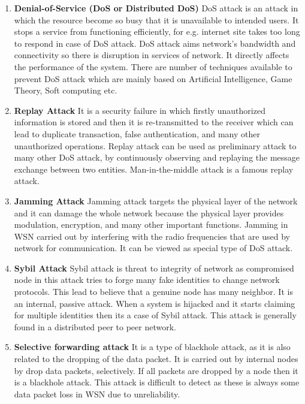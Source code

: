 \begin{enumerate}[label=\textbf{\roman*.}]
    \item \textbf{Denial-of-Service (DoS or Distributed DoS) }\cite{patil2016attack} DoS attack is an attack in which the resource become so busy that it is unavailable to intended users. It stops a service from functioning efficiently, for e.g. internet site takes too long to respond in case of DoS attack. DoS attack aims  network’s bandwidth and connectivity so there is disruption in services of network. It directly affects the performance of the system. There are number of techniques available to prevent DoS attack which are mainly based on Artificial Intelligence, Game Theory, Soft computing etc.
    \item \textbf{Replay Attack }\cite{sharma2017mitigating}
    It is a security failure in which firstly unauthorized information is stored and then it is re-transmitted to the receiver which can lead to duplicate transaction, false authentication, and many other unauthorized operations. Replay attack can be used as preliminary attack to many other DoS attack, by continuously observing and replaying the message exchange between two entities. Man-in-the-middle attack is a famous replay attack.

    \item \textbf{Jamming Attack }\cite{mpitziopoulos2009survey} Jamming attack targets the physical layer of the network and it can damage the whole network because the physical layer provides modulation, encryption, and many other important functions. Jamming in WSN carried out by interfering with the radio frequencies that are used by network for communication. It can be viewed as special type of DoS attack.
    
    \item \textbf{Sybil Attack }\cite{ssu2009detecting} Sybil attack is threat to integrity of network as compromised node in this attack tries to forge many fake identities to change network protocols. This lead to believe that a genuine node has many neighbor. It is an internal, passive attack. When a system is hijacked and it starts claiming for multiple identities then its a case of Sybil attack. This attack is generally found in a distributed peer to peer network. 
    
    \item \textbf{Selective forwarding attack }\cite{bysani2011survey} It is a type of blackhole attack, as it is also related to the dropping of the data packet. It is carried out by internal nodes by drop data packets, selectively. If all packets are dropped by a node then it is a blackhole attack. This attack is difficult to detect as these is always some data packet loss in WSN due to unreliability.
    

\end{enumerate}
